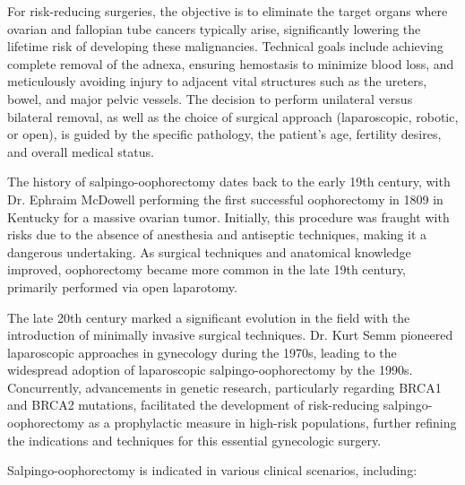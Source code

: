 For risk-reducing surgeries, the objective is to eliminate the target organs where ovarian and fallopian tube cancers typically arise, significantly lowering the lifetime risk of developing these malignancies. Technical goals include achieving complete removal of the adnexa, ensuring hemostasis to minimize blood loss, and meticulously avoiding injury to adjacent vital structures such as the ureters, bowel, and major pelvic vessels. The decision to perform unilateral versus bilateral removal, as well as the choice of surgical approach (laparoscopic, robotic, or open), is guided by the specific pathology, the patient's age, fertility desires, and overall medical status.

The history of salpingo-oophorectomy dates back to the early 19th century, with Dr. Ephraim McDowell performing the first successful oophorectomy in 1809 in Kentucky for a massive ovarian tumor. Initially, this procedure was fraught with risks due to the absence of anesthesia and antiseptic techniques, making it a dangerous undertaking. As surgical techniques and anatomical knowledge improved, oophorectomy became more common in the late 19th century, primarily performed via open laparotomy.

The late 20th century marked a significant evolution in the field with the introduction of minimally invasive surgical techniques. Dr. Kurt Semm pioneered laparoscopic approaches in gynecology during the 1970s, leading to the widespread adoption of laparoscopic salpingo-oophorectomy by the 1990s. Concurrently, advancements in genetic research, particularly regarding BRCA1 and BRCA2 mutations, facilitated the development of risk-reducing salpingo-oophorectomy as a prophylactic measure in high-risk populations, further refining the indications and techniques for this essential gynecologic surgery.

Salpingo-oophorectomy is indicated in various clinical scenarios, including:

